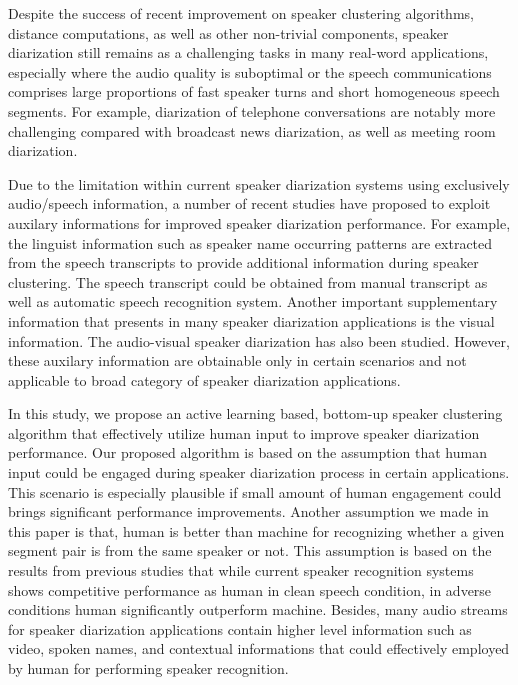\documentclass[journal]{IEEEtran}
\begin{document}
Despite the success of recent improvement on speaker clustering algorithms, distance computations, as well as other non-trivial components, speaker diarization still remains as a challenging tasks in many real-word applications, especially where the audio quality is suboptimal or the speech communications comprises large proportions of fast speaker turns and short homogeneous speech segments. For example, diarization of telephone conversations are notably more challenging compared with broadcast news diarization, as well as meeting room diarization. 

Due to the limitation within current speaker diarization systems using exclusively audio/speech information, a number of recent studies have proposed to exploit auxilary informations for improved speaker diarization performance. For example, the linguist information such as speaker name occurring patterns are extracted from the speech transcripts to provide additional information during speaker clustering. The speech transcript could be obtained from manual transcript as well as automatic speech recognition system. Another important supplementary information that presents in many speaker diarization applications is the visual information. The audio-visual speaker diarization has also been studied. However, these auxilary information are obtainable only in certain scenarios and not applicable to broad category of speaker diarization applications.

In this study, we propose an active learning based, bottom-up speaker clustering algorithm that effectively utilize human input to improve speaker diarization performance. Our proposed algorithm is based on the assumption that human input could be engaged during speaker diarization process in certain applications. This scenario is especially plausible if small amount of human engagement could brings significant performance improvements. Another assumption we made in this paper is that, human is better than machine for recognizing whether a given segment pair is from the same speaker or not. This assumption is based on the results from previous studies that while current speaker recognition systems shows competitive performance as human in clean speech condition, in adverse conditions human significantly outperform machine. Besides, many audio streams for speaker diarization applications contain higher level information such as video, spoken names, and contextual informations that could effectively employed by human for performing speaker recognition.
\end{document}
